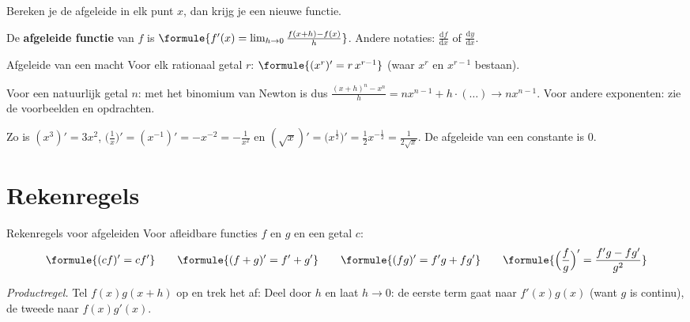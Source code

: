 Bereken je de afgeleide in elk punt $x$, dan krijg je een nieuwe functie.

\begin{theorie}
De \textbf{\textcolor{accent}{afgeleide functie}} van $f$ is $\formule{f'(x) = \lim_{h \to 0} \frac{f(x + h) - f(x)}{h}}$. Andere notaties: $\frac{\mathrm{d}f}{\mathrm{d}x}$ of $\frac{\mathrm{d}y}{\mathrm{d}x}$.
\begin{stelling}{Afgeleide van een macht}
Voor elk rationaal getal $r$: \quad $\formule{(x^r)' = r\,x^{r - 1}}$ \quad (waar $x^r$ en $x^{r-1}$ bestaan).
\end{stelling}
\begin{bewijs}
Voor een natuurlijk getal $n$: met het binomium van Newton is
dus $\frac{(x + h)^n - x^n}{h} = n x^{n-1} + h \cdot (\ldots) \to n x^{n-1}$. Voor andere exponenten: zie de voorbeelden en opdrachten.
\end{bewijs}
\end{theorie}

Zo is $(x^3)' = 3x^2$, $\bigl(\frac1x\bigr)' = (x^{-1})' = -x^{-2} = -\frac{1}{x^2}$ en $(\sqrt x)' = \bigl(x^{\frac12}\bigr)' = \frac12 x^{-\frac12} = \frac{1}{2\sqrt x}$. De afgeleide van een constante is $0$.


\begin{oefeningen}

\end{oefeningen}

\section{Rekenregels}

\begin{theorie}
\begin{stelling}{Rekenregels voor afgeleiden}
Voor afleidbare functies $f$ en $g$ en een getal $c$:
\[\formule{(cf)' = c f'} \qquad \formule{(f + g)' = f' + g'} \qquad \formule{(fg)' = f'g + fg'} \qquad \formule{\Bigl(\frac{f}{g}\Bigr)' = \frac{f'g - fg'}{g^2}}\]
\end{stelling}
\begin{bewijs}
\textit{Productregel.} Tel $f(x)g(x + h)$ op en trek het af:
Deel door $h$ en laat $h \to 0$: de eerste term gaat naar $f'(x)g(x)$ (want $g$ is continu), de tweede naar $f(x)g'(x)$.
\end{bewijs}
\end{theorie}

